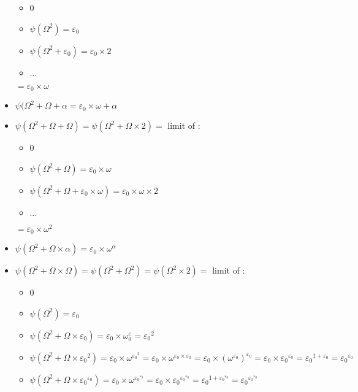 \documentclass[10pt]{article}
\begin{document}
\begin{itemize}
   \begin{itemize}
     \setlength{\itemsep}{1pt}
     \setlength{\parskip}{0pt}
     \setlength{\parsep}{0pt}
   \item 0
   \item \( \psi(\Omega^2)=\varepsilon_0 \)
   \item \( \psi(\Omega^2+\varepsilon_0) = \varepsilon_0 \times 2 \)
   \item \( \ldots \)
   \end{itemize}
   \( = \varepsilon_0 \times \omega \)
\item \( \psi(\Omega^2+\Omega+\alpha = \varepsilon_0 \times \omega + \alpha \)
\item \( \psi(\Omega^2+\Omega+\Omega) = \psi(\Omega^2+\Omega \times 2) = \) limit of : 
   \begin{itemize}
     \setlength{\itemsep}{1pt}
     \setlength{\parskip}{0pt}
     \setlength{\parsep}{0pt}
   \item 0
   \item \( \psi(\Omega^2+\Omega) = \varepsilon_0 \times \omega \)
   \item \( \psi(\Omega^2+\Omega+\varepsilon_0 \times \omega) = \varepsilon_0 \times \omega \times 2 \)
   \item \( \ldots \)
   \end{itemize}
   \( = \varepsilon_0 \times \omega^2 \)
\item \( \psi(\Omega^2+\Omega \times \alpha) = \varepsilon_0 \times \omega^\alpha \)
\item \( \psi(\Omega^2+\Omega \times \Omega) = \psi(\Omega^2+\Omega^2) = \psi(\Omega^2 \times 2) = \) limit of :
   \begin{itemize}
     \setlength{\itemsep}{1pt}
     \setlength{\parskip}{0pt}
     \setlength{\parsep}{0pt}
   \item 0
   \item \( \psi(\Omega^2) = \varepsilon_0 \)
   \item \( \psi(\Omega^2+\Omega \times \varepsilon_0) = \varepsilon_0 \times \omega^\varepsilon_0 = {\varepsilon_0}^2 \)
   \item \( \psi(\Omega^2+\Omega \times {\varepsilon_0}^2) = \varepsilon_0 \times \omega^{{\varepsilon_0}^2} = \varepsilon_0 \times \omega^{\varepsilon_0 \times \varepsilon_0} = \varepsilon_0 \times (\omega^{\varepsilon_0})^{\varepsilon_0} = \varepsilon_0 \times {\varepsilon_0}^{\varepsilon_0} = {\varepsilon_0}^{1+\varepsilon_0} = {\varepsilon_0}^{\varepsilon_0} \)
   \item \( \psi(\Omega^2+\Omega \times {\varepsilon_0}^{\varepsilon_0}) = \varepsilon_0 \times \omega^{{\varepsilon_0}^{\varepsilon_0}} = \varepsilon_0 \times {\varepsilon_0}^{{\varepsilon_0}^{\varepsilon_0}} = {\varepsilon_0}^{1+{\varepsilon_0}^{\varepsilon_0}} = {\varepsilon_0}^{{\varepsilon_0}^{\varepsilon_0}} \) 

\end{itemize}
\end{itemize}
\end{document}
